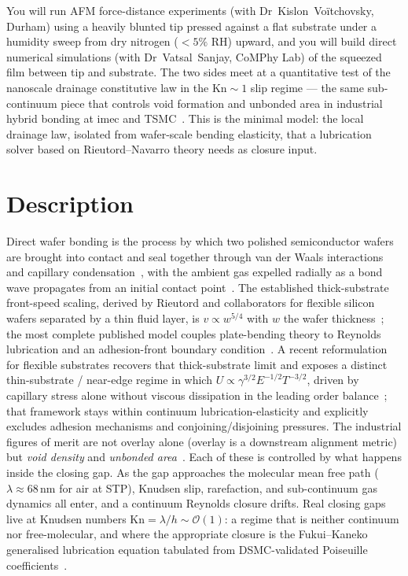 \documentclass[11pt]{article}
\begin{document}
\begin{tcolorbox}[colback=mgray,colframe=mpurple,title=TL;DR]
You will run AFM force-distance experiments (with Dr~Kislon~Vo\"itchovsky, Durham) using a heavily blunted tip pressed against a flat substrate under a humidity sweep from dry nitrogen ($<5\%$ RH) upward, and you will build direct numerical simulations (with Dr~Vatsal~Sanjay, CoMPhy Lab) of the squeezed film between tip and substrate. The two sides meet at a quantitative test of the nanoscale drainage constitutive law in the $\mathrm{Kn} \sim 1$ slip regime --- the same sub-continuum piece that controls void formation and unbonded area in industrial hybrid bonding at imec and TSMC~\citep{nagano2022void,sato2025factors}. This is the minimal model: the local drainage law, isolated from wafer-scale bending elasticity, that a lubrication solver based on Rieutord--Navarro theory needs as closure input.
\end{tcolorbox}

\section*{Description}

Direct wafer bonding is the process by which two polished semiconductor wafers are brought into contact and seal together through van der Waals interactions and capillary condensation~\citep{kim2018direct}, with the ambient gas expelled radially as a bond wave propagates from an initial contact point~\citep{plossl1999wafer,masteika2014review,gosele1995determines}. The established thick-substrate front-speed scaling, derived by Rieutord and collaborators for flexible silicon wafers separated by a thin fluid layer, is $v \propto w^{5/4}$ with $w$ the wafer thickness~\citep{rieutord2005dynamics}; the most complete published model couples plate-bending theory to Reynolds lubrication and an adhesion-front boundary condition~\citep{navarro2013direct}. A recent reformulation for flexible substrates recovers that thick-substrate limit and exposes a distinct thin-substrate / near-edge regime in which $U \propto \gamma^{3/2} E^{-1/2} T^{-3/2}$, driven by capillary stress alone without viscous dissipation in the leading order balance~\citep{jain2026bond}; that framework stays within continuum lubrication-elasticity and explicitly excludes adhesion mechanisms and conjoining/disjoining pressures. The industrial figures of merit are not overlay alone (overlay is a downstream alignment metric) but \emph{void density} and \emph{unbonded area}~\citep{nagano2022void,sato2025factors}. Each of these is controlled by what happens inside the closing gap. As the gap approaches the molecular mean free path ($\lambda \approx 68$\,nm for air at STP), Knudsen slip, rarefaction, and sub-continuum gas dynamics all enter, and a continuum Reynolds closure drifts. Real closing gaps live at Knudsen numbers $\mathrm{Kn} = \lambda/h \sim \mathcal{O}(1)$: a regime that is neither continuum nor free-molecular, and where the appropriate closure is the Fukui--Kaneko generalised lubrication equation tabulated from DSMC-validated Poiseuille coefficients~\citep{fukui1988analysis, fukui1990database}.
\end{document}

